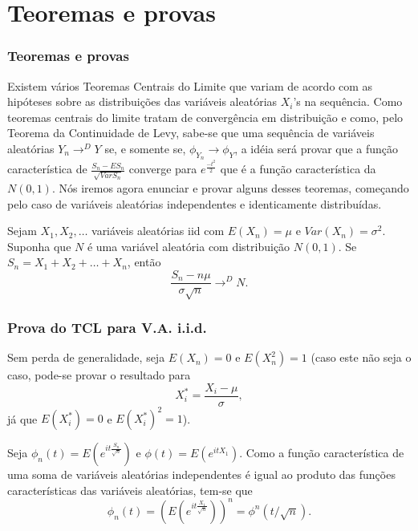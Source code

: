 \section{Teoremas e provas}
\begin{frame}
\frametitle{\textbf{Teoremas e provas}}


Existem vários Teoremas Centrais do Limite que variam de acordo com
as hipóteses sobre as distribuições das variáveis aleatórias $X_i$'s
na sequência. Como teoremas centrais do limite tratam de
convergência em distribuição e como, pelo Teorema da Continuidade de
Levy, sabe-se que uma sequência de variáveis aleatórias
$Y_n\rightarrow^D Y$ se, e somente se, $\phi_{Y_n}\rightarrow
\phi_Y$, a idéia será provar que a função característica de
$\frac{S_n-ES_n}{\sqrt{Var S_n}}$ converge para $e^{\frac{-t^2}{2}}$
que é a função característica da $N(0,1)$. Nós iremos agora enunciar
e provar alguns desses teoremas, começando pelo caso de variáveis
aleatórias independentes e identicamente distribuídas.

\begin{teo}
Sejam $X_1,X_2,\ldots$ variáveis aleatórias iid com $E(X_n)=\mu$ e
$Var(X_n)=\sigma^2$. Suponha que $N$ é uma variável aleatória com
distribuição $N(0,1)$. Se $S_n=X_1+X_2+\ldots+X_n$, então
$$\frac{S_n-n\mu}{\sigma\sqrt{n}}\rightarrow^D N.$$
\end{teo}

\end{frame}

\begin{frame}
\frametitle{\textbf{Prova do TCL para V.A. i.i.d.}}
\baselineskip=13pt
\begin{block}{}


Sem perda de generalidade, seja $E(X_n)=0$ e $E(X_n^2)=1$ (caso
este não seja o caso, pode-se provar o resultado para
$$X_i^*=\frac{X_i-\mu}{\sigma},$$
já que $E(X^*_i)=0$ e $E(X^*_i)^2=1$).

Seja $\phi_n(t)=E(e^{it\frac{S_n}{\sqrt{n}}})$ e
$\phi(t)=E(e^{itX_1})$. Como a função característica de uma soma de
variáveis aleatórias independentes é igual ao produto das funções
características das variáveis aleatórias, tem-se que
$$\phi_n(t)=(E(e^{it\frac{X_1}{\sqrt{n}}}))^n=\phi^n(t/\sqrt{n}).$$

\end{block}
\end{frame}

